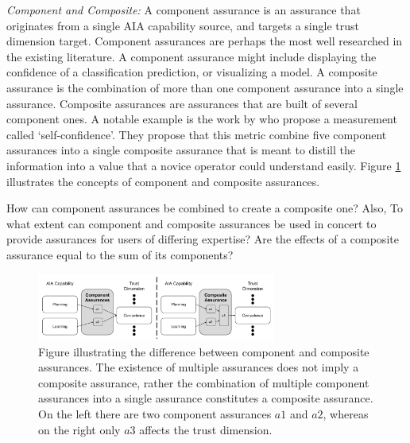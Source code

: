 \emph{Component and Composite:}
A component assurance is an assurance that originates from a single AIA capability source, and targets a single trust dimension target. Component assurances are perhaps the most well researched in the existing literature. A component assurance might include displaying the confidence of a classification prediction, or visualizing a model. A composite assurance is the combination of more than one component assurance into a single assurance. Composite assurances are assurances that are built of several component ones. A notable example is the work by \citet{Aitken2016-cv} who propose a measurement called `self-confidence'. They propose that this metric combine five component assurances into a single composite assurance that is meant to distill the information into a value that a novice operator could understand easily. Figure \ref{fig:assurance_mapping} illustrates the concepts of component and composite assurances. 

How can component assurances be combined to create a composite one? Also, To what extent can component and composite assurances be used in concert to provide assurances for users of differing expertise? Are the effects of a composite assurance equal to the sum of its components?

\begin{figure}[!htbp]
    \centering
    \includegraphics[width=0.7\textwidth]{Figures/Assurance_component_composite.pdf}
    \caption{Figure illustrating the difference between component and composite assurances. The existence of multiple assurances does not imply a composite assurance, rather the combination of multiple component assurances into a single assurance constitutes a composite assurance. On the left there are two component assurances $a1$ and $a2$, whereas on the right only $a3$ affects the trust dimension.}
    \label{fig:assurance_mapping}
\end{figure}
